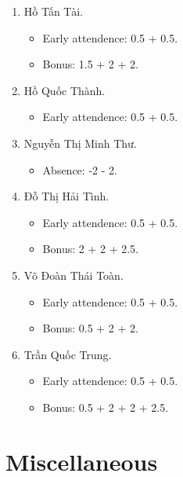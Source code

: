 \documentclass{article}
\begin{document}
\begin{enumerate}
\begin{itemize}
	\end{itemize}
	\item {\sc Hồ Tấn Tài.}
	\begin{itemize}
		\item Early attendence: 0.5 + 0.5.
		\item Bonus: 1.5 + 2 + 2.
	\end{itemize}
	\item {\sc Hồ Quốc Thành.}
	\begin{itemize}
		\item Early attendence: 0.5 + 0.5.
	\end{itemize}
	\item {\sc Nguyễn Thị Minh Thư.}
	\begin{itemize}
		\item Absence: -2 - 2.
	\end{itemize}
	\item {\sc Đỗ Thị Hải Tình.}
	\begin{itemize}
		\item Early attendence: 0.5 + 0.5.
		\item Bonus: 2 + 2 + 2.5.
	\end{itemize}
	\item {\sc Võ Đoàn Thái Toàn.}
	\begin{itemize}
		\item Early attendence: 0.5 + 0.5.
		\item Bonus: 0.5 + 2 + 2.
	\end{itemize}
	\item {\sc Trần Quốc Trung.}
	\begin{itemize}
		\item Early attendence: 0.5 + 0.5.
		\item Bonus: 0.5 + 2 + 2 + 2.5.
	\end{itemize}
\end{enumerate}


\section{Miscellaneous}


\printbibliography[heading=bibintoc]
	
\end{document}
